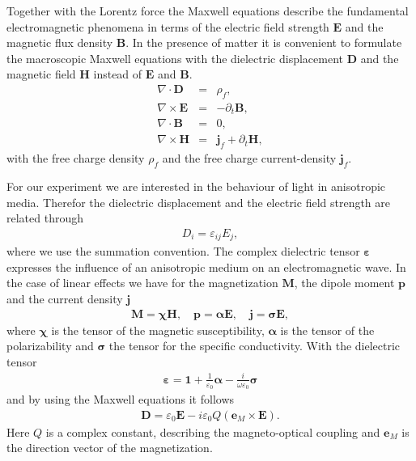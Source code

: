 \documentclass[a4paper,10pt]{scrartcl}
\begin{document}
Together with the Lorentz force the Maxwell equations describe the fundamental electromagnetic phenomena in terms of the electric field strength $\mathbf{E}$ and the magnetic flux density $\mathbf{B}$. In the presence of matter it is convenient to formulate the macroscopic Maxwell equations with the dielectric displacement $\mathbf{D}$ and the magnetic field $\mathbf{H}$ instead of $\mathbf{E}$ and $\mathbf{B}$.
\begin{eqnarray}
 \nabla \cdot \mathbf{D}  &=& \rho_f, \\
 \nabla \times \mathbf{E} &=& -\partial_t\mathbf{B}, \\
 \nabla \cdot \mathbf{B}  &=& 0, \\
 \nabla \times \mathbf{H} &=& \mathbf{j}_f + \partial_t\mathbf{H},
\end{eqnarray}
with the free charge density $\rho_f$ and the free charge current-density $\mathbf{j}_f$.

For our experiment we are interested in the behaviour of light in anisotropic media. Therefor the dielectric displacement and the electric field strength are related through 
\begin{eqnarray}
 D_i = \varepsilon_{ij}E_j,
\end{eqnarray}
where we use  the summation convention.  The complex dielectric tensor $\mathbf{\varepsilon}$ expresses the influence of an anisotropic medium on an electromagnetic wave. In the case of linear effects we have for the magnetization $\mathbf{M}$, the dipole moment $\mathbf{p}$ and the current density $\mathbf{j}$
\begin{eqnarray}
 \mathbf{M} =  \mathbf{\chi H}, \quad \mathbf{p} = \mathbf{\alpha E}, \quad \mathbf{j} = \mathbf{\sigma E}, 
\end{eqnarray}
where $\mathbf{\chi}$ is the tensor of the magnetic susceptibility, $\mathbf{\alpha}$ is the tensor of the polarizability and $\mathbf{\sigma}$ the tensor for the specific conductivity. With the dielectric tensor 
\begin{eqnarray}
 \mathbf{\varepsilon} = \mathbf{1} + \frac{1}{\varepsilon_0}\mathbf{\alpha}- \frac{i}{\omega \varepsilon_0}\mathbf{\sigma}
\end{eqnarray}
and by using the Maxwell equations it follows
\begin{eqnarray}
 \mathbf{D} = \varepsilon_0 \mathbf{E} - i\varepsilon_0 Q \left( \mathbf{e}_M\times \mathbf{E} \right).
\end{eqnarray}
Here $Q$ is a complex constant, describing the magneto-optical coupling and $\mathbf{e}_M$ is the direction vector of the magnetization. 
\end{document}

